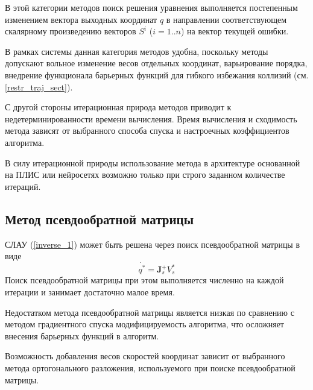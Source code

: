В этой категории методов поиск решения уравнения выполняется постепенным изменением вектора выходных координат $q$ в направлении соответствующем скалярному произведению векторов $S^i$ ($i=1..n$) на вектор текущей ошибки.

В рамках системы данная категория методов удобна, поскольку методы допускают вольное изменение весов отдельных координат, варьирование порядка, внедрение функционала барьерных функций для гибкого избежания коллизий (см. \ref{restr_traj_sect}).

С другой стороны итерационная природа методов приводит к недетерминированности времени вычисления. Время вычисления и сходимость метода зависят от выбранного способа спуска и настроечных коэффициентов алгоритма. 

В силу итерационной природы использование метода в архитектуре основанной на ПЛИС или нейросетях возможно только при строго заданном количестве итераций.

\subsection{Метод псевдообратной матрицы}

СЛАУ (\ref{inverse_1}) может быть решена через поиск псевдообратной матрицы в виде
\begin{equation}\label{inverse_1}
\dot{q^*} = \textbf{J}_s^+ V_s^* 
\end{equation}
Поиск псевдообратной матрицы при этом выполняется численно на каждой итерации и занимает достаточно малое время.

Недостатком метода псевдообратной матрицы является низкая по сравнению с методом градиентного спуска модифицируемость алгоритма, что осложняет внесения барьерных функций в алгоритм.

Возможность добавления весов скоростей координат зависит от выбранного метода ортогонального разложения, используемого при поиске псевдообратной матрицы. 
